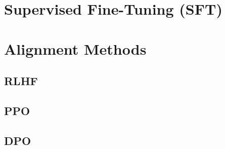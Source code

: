 \section{Supervised Fine-Tuning (SFT)}\label{sec:supervised-fine-tuning}

\section{Alignment Methods}\label{sec:alignment-methods}

\subsection{RLHF}\label{subsec:rlhf}
\subsection{PPO}\label{subsec:ppo}
\subsection{DPO}\label{subsec:dpo}
